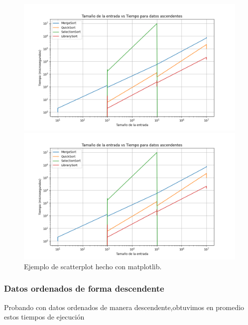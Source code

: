 \begin{figure}[H]
    \centering
    \begin{minipage}[t]{0.5\textwidth}
        \includegraphics[width=\textwidth]{../code/sorting/data/plots/ascendente_plot.png}
    \end{minipage}%
    \begin{minipage}[t]{0.5\textwidth}
        \includegraphics[width=\textwidth]{../code/sorting/data/plots/ascendente_plot.png}
     \end{minipage}%
    \caption{Ejemplo de scatterplot hecho con matplotlib.}
    \label{fig:ordenadas_ascendente}
\end{figure}

\newpage

\subsubsection*{Datos ordenados de forma descendente}

Probando con datos ordenados de manera descendente,obtuvimos en promedio estos tiempos de ejecución


